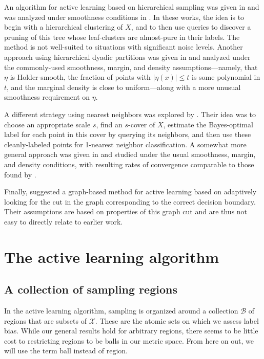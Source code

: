 \documentclass{article}
\def\X{{\mathcal X}}
\def\B{{\mathcal B}}
\begin{document}
An algorithm for active learning based on hierarchical sampling was given in \cite{DH08} and was analyzed under smoothness conditions in \cite{KUB15}. In these works, the idea is to begin with a hierarchical clustering of $X$, and to then use queries to discover a pruning of this tree whose leaf-clusters are almost-pure in their labels. The method is not well-suited to situations with significant noise levels. Another approach using hierarchical dyadic partitions was given in \cite{M12} and analyzed under the commonly-used smoothness, margin, and density assumptions---namely, that $\eta$ is Holder-smooth, the fraction of points with $|\eta(x)| \leq t$ is some polynomial in $t$, and the marginal density is close to uniform---along with a more unusual smoothness requirement on $\eta$.

A different strategy using nearest neighbors was explored by \cite{ASU18}. Their idea was to choose an appropriate scale $s$, find an $s$-cover of $X$, estimate the Bayes-optimal label for each point in this cover by querying its neighbors, and then use these cleanly-labeled points for 1-nearest neighbor classification. A somewhat more general approach was given in \cite{H17} and studied under the usual smoothness, margin, and density conditions, with resulting rates of convergence comparable to those found by \cite{M12}.

Finally, \cite{DNZ15} suggested a graph-based method for active learning based on adaptively looking for the cut in the graph corresponding to the correct decision boundary. Their assumptions are based on properties of this graph cut and are thus not easy to directly relate to earlier work.


\section{The active learning algorithm}

\subsection{A collection of sampling regions}

In the active learning algorithm, sampling is organized around a
collection $\B$ of regions that are subsets of $\X$. These are the
atomic sets on which we assess label bias. While our general results
hold for arbitrary regions, there seems to be little cost to
restricting regions to be balls in our metric space. From here on out,
we will use the term ball instead of region.
\end{document}
